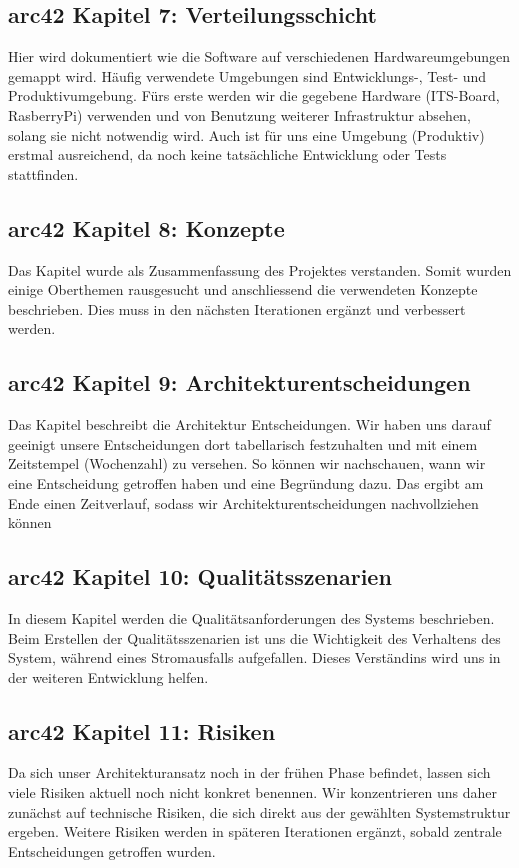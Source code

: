 \documentclass{article}
\begin{document}
\subsection{arc42 Kapitel 7: Verteilungsschicht}
Hier wird dokumentiert wie die Software auf verschiedenen Hardwareumgebungen gemappt wird. 
Häufig verwendete Umgebungen sind Entwicklungs-, Test- und Produktivumgebung.
Fürs erste werden wir die gegebene Hardware (ITS-Board, RasberryPi) verwenden und von Benutzung weiterer Infrastruktur absehen, solang sie nicht notwendig wird.
Auch ist für uns eine Umgebung (Produktiv) erstmal ausreichend, da noch keine tatsächliche Entwicklung oder Tests stattfinden.

\subsection{arc42 Kapitel 8: Konzepte}
Das Kapitel wurde als Zusammenfassung des Projektes verstanden. Somit wurden einige Oberthemen rausgesucht und anschliessend die verwendeten Konzepte beschrieben. Dies muss in den nächsten Iterationen ergänzt und verbessert werden.

\subsection{arc42 Kapitel 9: Architekturentscheidungen}
Das Kapitel beschreibt die Architektur Entscheidungen. Wir haben uns darauf geeinigt unsere Entscheidungen dort tabellarisch festzuhalten und mit einem Zeitstempel (Wochenzahl) zu versehen. So können wir nachschauen, wann wir eine Entscheidung getroffen haben und eine Begründung dazu. Das ergibt am Ende einen Zeitverlauf, sodass wir Architekturentscheidungen nachvollziehen können

\subsection{arc42 Kapitel 10: Qualitätsszenarien}
In diesem Kapitel werden die Qualitätsanforderungen des Systems beschrieben. Beim Erstellen der Qualitätsszenarien ist uns die Wichtigkeit des Verhaltens des System, während eines Stromausfalls aufgefallen. Dieses Verständins wird uns in der weiteren Entwicklung helfen. 

\subsection{arc42 Kapitel 11: Risiken}
Da sich unser Architekturansatz noch in der frühen Phase befindet, lassen sich viele Risiken aktuell noch nicht konkret benennen.
Wir konzentrieren uns daher zunächst auf technische Risiken, die sich direkt aus der gewählten Systemstruktur ergeben. Weitere Risiken werden in späteren Iterationen ergänzt, sobald zentrale Entscheidungen getroffen wurden.
\end{document}

